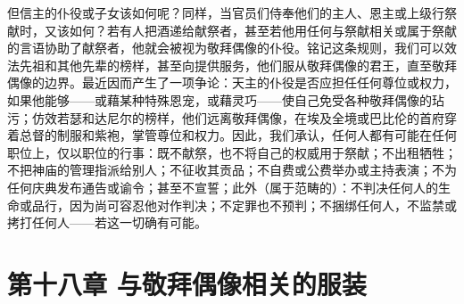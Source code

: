 但信主的仆役或子女该如何呢？同样，当官员们侍奉他们的主人、恩主或上级行祭献时，又该如何？若有人把酒递给献祭者，甚至若他用任何与祭献相关或属于祭献的言语协助了献祭者，他就会被视为敬拜偶像的仆役。铭记这条规则，我们可以效法先祖和其他先辈的榜样，甚至向提供服务，他们服从敬拜偶像的君王，直至敬拜偶像的边界。最近因而产生了一项争论：天主的仆役是否应担任任何尊位或权力，如果他能够——或藉某种特殊恩宠，或藉灵巧——使自己免受各种敬拜偶像的玷污；仿效若瑟和达尼尔的榜样，他们远离敬拜偶像，在埃及全境或巴比伦的首府穿着总督的制服和紫袍，掌管尊位和权力。因此，我们承认，任何人都有可能在任何职位上，仅以职位的行事：既不献祭，也不将自己的权威用于祭献；不出租牺牲；不把神庙的管理指派给别人；不征收其贡品；不自费或公费举办或主持表演；不为任何庆典发布通告或谕令；甚至不宣誓；此外（属于范畴的）：不判决任何人的生命或品行，因为尚可容忍他对作判决；不定罪也不预判；不捆绑任何人，不监禁或拷打任何人——若这一切确有可能。\par


\section{第十八章 与敬拜偶像相关的服装}

